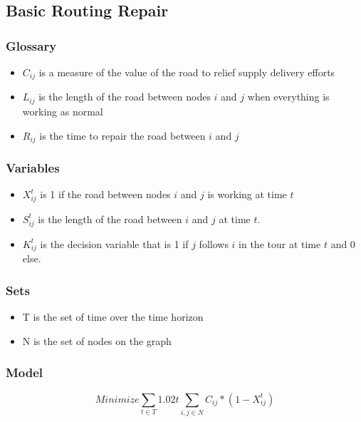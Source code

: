 \documentclass{article}
\begin{document}
	\subsection{Basic Routing Repair}
	\subsubsection{Glossary}
	\begin{itemize}
		\item $C_{ij}$ is a measure of the value of the road to relief supply delivery efforts
		\item $L_{ij}$ is the length of the road between nodes $i$ and $j$ when everything is working as normal
		\item $R_{ij}$ is the time to repair the road between $i$ and $j$
	\end{itemize}
	\subsubsection{Variables}
	\begin{itemize}
		\item $X_{ij}^t$ is 1 if the road between nodes $i$ and $j$ is working at time $t$
		\item $S_{ij}^t$ is the length of the road between $i$ and $j$ at time $t$. 
		\item $K_{ij}^t$ is the decision variable that is 1 if $j$ follows $i$ in the tour at time $t$ and 0 else.
		
	\end{itemize}
	\subsubsection{Sets}
	\begin{itemize}
		\item T is the set of time over the time horizon
		\item N is the set of nodes on the graph
	\end{itemize}
	\subsubsection{Model}
	$$	Minimize \sum_{t \in T} 1.02t \sum_{i,j \in N} C_{ij}*(1-X_{ij}^t) $$
	
\end{document}
